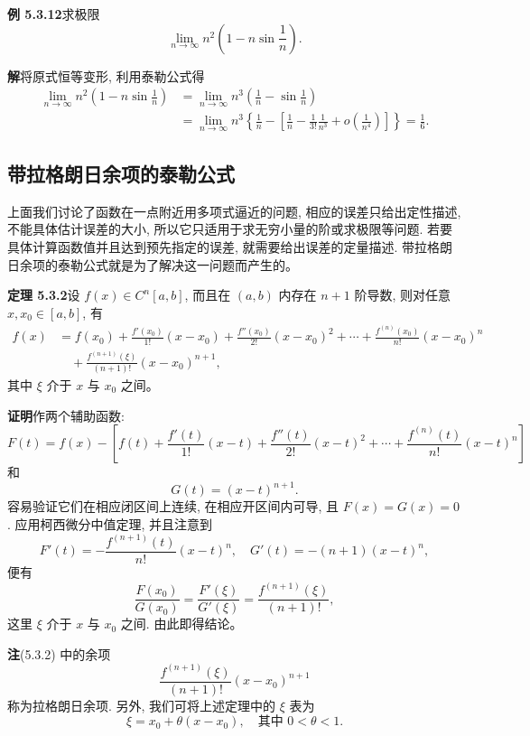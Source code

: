 \documentclass[UTF8, 12pt, fontset=fandol, oneside]{ctexart}
\begin{document}
\noindent\textbf{例 5.3.12}\quad 求极限
\[
  \lim_{n\to\infty}n^2\left(1-n\sin\frac1n\right).
\]

\noindent\textbf{解}\quad 将原式恒等变形, 利用泰勒公式得
\[
\begin{aligned}
  \lim_{n\to\infty}n^2\left(1-n\sin\frac1n\right)
  &=
  \lim_{n\to\infty}n^3\left(\frac1n-\sin\frac1n\right) \\
  &=
  \lim_{n\to\infty}n^3
  \left\{
    \frac1n-
    \left[\frac1n-\frac1{3!}\frac1{n^3}+o\left(\frac1{n^4}\right)\right]
  \right\}
  =
  \frac16.
\end{aligned}
\]

\subsection{带拉格朗日余项的泰勒公式}

上面我们讨论了函数在一点附近用多项式逼近的问题, 相应的误差只给出定性描述, 不能具体估计误差的大小, 所以它只适用于求无穷小量的阶或求极限等问题. 若要具体计算函数值并且达到预先指定的误差, 就需要给出误差的定量描述. 带拉格朗日余项的泰勒公式就是为了解决这一问题而产生的。

\noindent\textbf{定理 5.3.2}\quad 设 $f(x)\in C^n[a,b]$, 而且在 $(a,b)$ 内存在 $n+1$ 阶导数, 则对任意 $x,x_0\in[a,b]$, 有
\[
\begin{aligned}
  f(x)
  &=
  f(x_0)+\frac{f'(x_0)}{1!}(x-x_0)+\frac{f''(x_0)}{2!}(x-x_0)^2
  +\cdots+\frac{f^{(n)}(x_0)}{n!}(x-x_0)^n \\
  &\quad+
  \frac{f^{(n+1)}(\xi)}{(n+1)!}(x-x_0)^{n+1},
\end{aligned}
  \tag{5.3.2}
\]
其中 $\xi$ 介于 $x$ 与 $x_0$ 之间。

\noindent\textbf{证明}\quad 作两个辅助函数:
\[
  F(t)=f(x)-\left[
  f(t)+\frac{f'(t)}{1!}(x-t)+\frac{f''(t)}{2!}(x-t)^2
  +\cdots+\frac{f^{(n)}(t)}{n!}(x-t)^n
  \right]
\]
和
\[
  G(t)=(x-t)^{n+1}.
\]
容易验证它们在相应闭区间上连续, 在相应开区间内可导, 且 $F(x)=G(x)=0$. 应用柯西微分中值定理, 并且注意到
\[
  F'(t)=-\frac{f^{(n+1)}(t)}{n!}(x-t)^n,\quad
  G'(t)=-(n+1)(x-t)^n,
\]
便有
\[
  \frac{F(x_0)}{G(x_0)}
  =
  \frac{F'(\xi)}{G'(\xi)}
  =
  \frac{f^{(n+1)}(\xi)}{(n+1)!},
\]
这里 $\xi$ 介于 $x$ 与 $x_0$ 之间. 由此即得结论。

\noindent\textbf{注}\quad (5.3.2) 中的余项
\[
  \frac{f^{(n+1)}(\xi)}{(n+1)!}(x-x_0)^{n+1}
\]
称为拉格朗日余项. 另外, 我们可将上述定理中的 $\xi$ 表为
\[
  \xi=x_0+\theta(x-x_0),\quad \text{其中 }0<\theta<1.
\]
\end{document}
